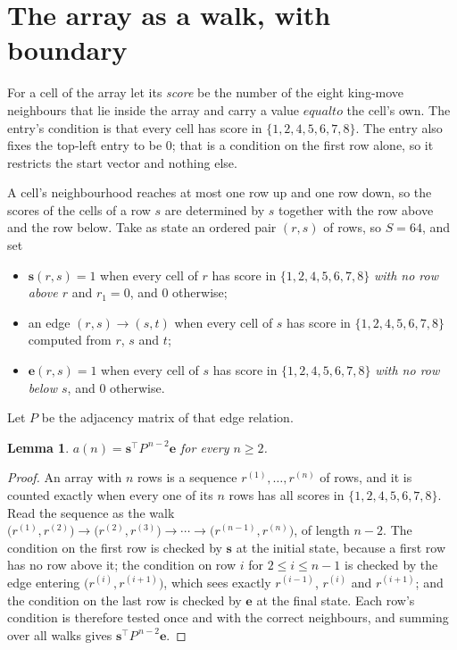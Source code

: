 \documentclass[11pt,a4paper]{article}
\theoremstyle{plain}
\newtheorem{lemma}[theorem]{Lemma}
\theoremstyle{definition}
\begin{document}
\section{The array as a walk, with boundary}

For a cell of the array let its \emph{score} be the number of the eight king-move neighbours that lie inside
the array and carry a value $equal to$ the cell's own. The entry's condition is that every cell
has score in $\{1,2,4,5,6,7,8\}$. The entry also fixes the top-left entry to be $0$; that is a condition on the first row alone, so it restricts the start vector and nothing else.

A cell's neighbourhood reaches at most one row up and one row down, so the scores of the
cells of a row $s$ are determined by $s$ together with the row above and the row below.
Take as state an ordered pair $(r,s)$ of rows, so $S=64$, and set
\begin{itemize}
\item $\mathbf{s}(r,s)=1$ when every cell of $r$ has score in $\{1,2,4,5,6,7,8\}$ \emph{with no row
above $r$} and $r_1=0$, and $0$ otherwise;
\item an edge $(r,s)\to(s,t)$ when every cell of $s$ has score in $\{1,2,4,5,6,7,8\}$ computed from
$r$, $s$ and $t$;
\item $\mathbf{e}(r,s)=1$ when every cell of $s$ has score in $\{1,2,4,5,6,7,8\}$ \emph{with no row
below $s$}, and $0$ otherwise.
\end{itemize}
Let $P$ be the adjacency matrix of that edge relation.

\begin{lemma}\label{lem:walk}
$a(n)=\mathbf{s}^{\!\top}P^{\,n-2}\mathbf{e}$ for every $n\ge2$.
\end{lemma}

\begin{proof}
An array with $n$ rows is a sequence $r^{(1)},\dots,r^{(n)}$ of rows, and it is counted
exactly when every one of its $n$ rows has all scores in $\{1,2,4,5,6,7,8\}$. Read the sequence as the
walk $\bigl(r^{(1)},r^{(2)}\bigr)\to\bigl(r^{(2)},r^{(3)}\bigr)\to\cdots\to
\bigl(r^{(n-1)},r^{(n)}\bigr)$, of length $n-2$. The condition on the first row is
checked by $\mathbf{s}$ at the initial state, because a first row has no row above it; the
condition on row $i$ for $2\le i\le n-1$ is checked by the edge entering
$\bigl(r^{(i)},r^{(i+1)}\bigr)$, which sees exactly $r^{(i-1)}$, $r^{(i)}$ and
$r^{(i+1)}$; and the condition on the last row is checked by $\mathbf{e}$ at the final
state. Each row's condition is therefore tested once and with the correct neighbours, and
summing over all walks gives $\mathbf{s}^{\!\top}P^{\,n-2}\mathbf{e}$.
\end{proof}
\end{document}
